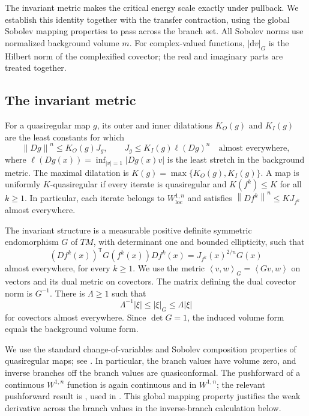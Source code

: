 \documentclass[11pt,reqno]{amsart}
\theoremstyle{plain}
\theoremstyle{definition}
\theoremstyle{remark}
\newcommand{\norm}[1]{\left\lVert #1\right\rVert}
\newcommand{\ip}[2]{\left\langle #1,#2\right\rangle}
\newcommand{\dd}{\mathrm d}
\numberwithin{equation}{section}
\begin{document}
The invariant metric makes the critical energy scale exactly under pullback. We establish this identity together with the transfer contraction, using the global Sobolev mapping properties to pass across the branch set. All Sobolev norms use normalized background volume $m$. For complex-valued functions, $|\dd v|_G$ is the Hilbert norm of the complexified covector; the real and imaginary parts are treated together.

\subsection{The invariant metric}

For a quasiregular map $g$, its outer and inner dilatations $K_O(g)$ and $K_I(g)$ are the least constants for which
\[
 \norm{Dg}^n\le K_O(g)J_g,
 \qquad J_g\le K_I(g)\ell(Dg)^n
 \quad\text{almost everywhere},
\]
where $\ell(Dg(x))=\inf_{|v|=1}|Dg(x)v|$ is the least stretch in the background metric. The maximal dilatation is $K(g)=\max\{K_O(g),K_I(g)\}$. A map is uniformly $K$-quasiregular if every iterate is quasiregular and $K(f^k)\le K$ for all $k\ge1$. In particular, each iterate belongs to $W^{1,n}_{\mathrm{loc}}$ and satisfies $\norm{Df^k}^n\le KJ_{f^k}$ almost everywhere.

The invariant structure is a measurable positive definite symmetric endomorphism $G$ of $TM$, with determinant one and bounded ellipticity, such that
\begin{equation}\label{eq:beltrami}
 (Df^k(x))^{\mathsf T}G(f^k(x))Df^k(x)
 =J_{f^k}(x)^{2/n}G(x)
\end{equation}
almost everywhere, for every $k\ge1$. We use the metric $\ip{v}{w}_G=\ip{Gv}{w}$ on vectors and its dual metric on covectors. The matrix defining the dual covector norm is $G^{-1}$. There is $\Lambda\ge1$ such that
\begin{equation}\label{eq:ellipticity}
 \Lambda^{-1}|\xi|\le |\xi|_G\le\Lambda|\xi|
\end{equation}
for covectors almost everywhere. Since $\det G=1$, the induced volume form equals the background volume form.

We use the standard change-of-variables and Sobolev composition properties of quasiregular maps; see \cite{HKM93, Rickman93}. In particular, the branch values have volume zero, and inverse branches off the branch values are quasiconformal. The pushforward of a continuous $W^{1,n}$ function is again continuous and in $W^{1,n}$; the relevant pushforward result is \cite[Lemmas 14.30 and 14.31]{HKM93}, used in \cite[Section 2]{OP14}. This global mapping property justifies the weak derivative across the branch values in the inverse-branch calculation below.
\end{document}

